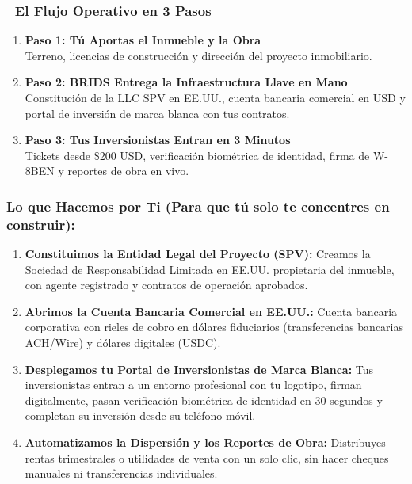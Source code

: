 \documentclass[
]{article}
\providecommand{\tightlist}{%
  \setlength{\itemsep}{0pt}\setlength{\parskip}{0pt}}
\renewenvironment{quote}{%
  \vspace{0.4em}
  \begin{tcolorbox}[
    colback=bridsLight,
    colframe=bridsBlue,
    arc=2mm,
    boxrule=1.2pt,
    left=10pt,
    right=10pt,
    top=8pt,
    bottom=8pt,
    before skip=6pt,
    after skip=8pt
  ]%
}{%
  \end{tcolorbox}%
}
\begin{document}
\begin{quote}
\mbox{}%
\subsubsection{🔄 El Flujo Operativo en 3
Pasos}\label{el-flujo-operativo-en-3-pasos}

\begin{enumerate}
\def\labelenumi{\arabic{enumi}.}
\tightlist
\item
  \textbf{Paso 1: Tú Aportas el Inmueble y la Obra}\\
  Terreno, licencias de construcción y dirección del proyecto
  inmobiliario.
\item
  \textbf{Paso 2: BRIDS Entrega la Infraestructura Llave en Mano}\\
  Constitución de la LLC SPV en EE.UU., cuenta bancaria comercial en USD
  y portal de inversión de marca blanca con tus contratos.
\item
  \textbf{Paso 3: Tus Inversionistas Entran en 3 Minutos}\\
  Tickets desde \$200 USD, verificación biométrica de identidad, firma
  de W-8BEN y reportes de obra en vivo.
\end{enumerate}
\end{quote}

\subsubsection{Lo que Hacemos por Ti (Para que tú solo te concentres en
construir):}\label{lo-que-hacemos-por-ti-para-que-tuxfa-solo-te-concentres-en-construir}

\begin{enumerate}
\def\labelenumi{\arabic{enumi}.}
\tightlist
\item
  \textbf{Constituimos la Entidad Legal del Proyecto (SPV):} Creamos la
  Sociedad de Responsabilidad Limitada en EE.UU. propietaria del
  inmueble, con agente registrado y contratos de operación aprobados.
\item
  \textbf{Abrimos la Cuenta Bancaria Comercial en EE.UU.:} Cuenta
  bancaria corporativa con rieles de cobro en dólares fiduciarios
  (transferencias bancarias ACH/Wire) y dólares digitales (USDC).
\item
  \textbf{Desplegamos tu Portal de Inversionistas de Marca Blanca:} Tus
  inversionistas entran a un entorno profesional con tu logotipo, firman
  digitalmente, pasan verificación biométrica de identidad en 30
  segundos y completan su inversión desde su teléfono móvil.
\item
  \textbf{Automatizamos la Dispersión y los Reportes de Obra:}
  Distribuyes rentas trimestrales o utilidades de venta con un solo
  clic, sin hacer cheques manuales ni transferencias individuales.
\end{enumerate}
\end{document}

